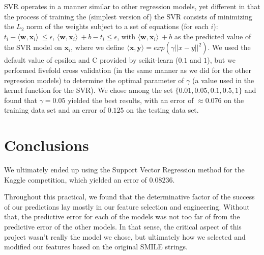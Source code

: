 \documentclass[11pt]{article}
\begin{document}
SVR operates in a manner similar to other regression models, yet different in that the process of training the (simplest version of) the SVR consists of minimizing the $L_2$ norm of the weights subject to a set of equations (for each $i$): $t_i -  \langle \textbf{w}, \textbf{x}_i\rangle\ \leq \epsilon $, $\langle \textbf{w}, \textbf{x}_i \rangle\ + b - t_i \leq \epsilon$, with $\langle \textbf{w}, \textbf{x}_i\rangle\ + b$ as the predicted value of the SVR model on $\textbf{x}_i$, where we define $\langle \textbf{x}, \textbf{y} \rangle = exp(\gamma||x - y||^2)$. We used the default value of epsilon and C provided by scikit-learn ($0.1$ and $1$), but we performed fivefold cross validation (in the same manner as we did for the other regression models) to determine the optimal parameter of $\gamma$ (a value used in the kernel function for the SVR). We chose among the set $\{0.01, 0.05, 0.1, 0.5, 1\}$ and found that $\gamma = 0.05$ yielded the best results, with an error of $\approx 0.076$ on the training data set and an error of $0.125$ on the testing data set.

\section{Conclusions}

We ultimately ended up using the Support Vector Regression method for the Kaggle competition, which yielded an error of $0.08236$.

Throughout this practical, we found that the determinative factor of the success of our predictions lay mostly in our feature selection and engineering. Without that, the predictive error for each of the models was not too far of from the predictive error of the other models. In that sense, the critical aspect of this project wasn't really the model we chose, but ultimately how we selected and modified our features based on the original SMILE strings.
\end{document}
